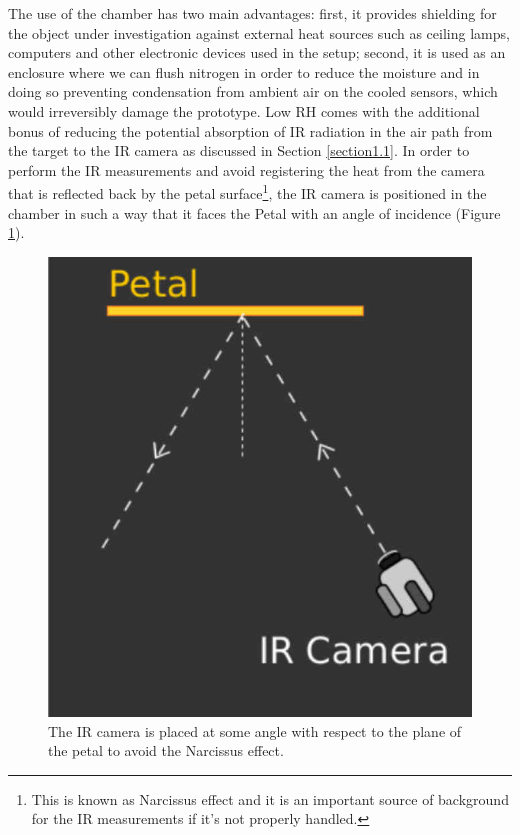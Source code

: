 		The use of the chamber has two main advantages: first, it provides shielding for the object under investigation against external heat sources such as ceiling lamps, computers and other electronic devices used in the setup; second, it is used as an enclosure where we can flush nitrogen in order to reduce the moisture and in doing so preventing condensation from ambient air on the cooled sensors, which would irreversibly damage the prototype. Low RH comes with the additional bonus of reducing the potential absorption of IR radiation in the air path from the target to the IR camera as discussed in Section \ref{section1.1}.
		In order to perform the IR measurements and avoid registering the heat from the camera that is reflected back by the petal surface\footnote{{\footnotesize This is known as Narcissus effect and it is an important source of background for the IR measurements if it’s not properly handled.}}, the IR camera is positioned in the chamber in such a way that it faces the Petal with an angle of incidence (Figure \ref{fig2.4}).	
		
		\begin{figure}[ht!]
			\centering
			\captionsetup{justification=centering,margin=2cm}
			\includegraphics[scale=0.25]{Figures/Chapter02/NarcissusEffect.jpg}
			\caption{The IR camera is placed at some angle with respect to the plane of the petal to avoid the Narcissus effect.}\label{fig2.4}
		\end{figure}\bigskip
		
